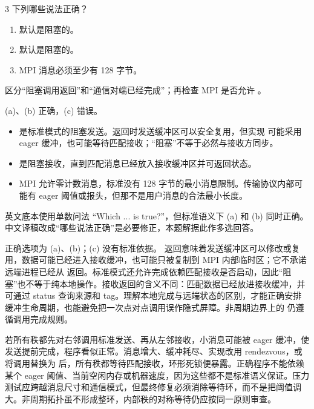 \begin{solutionexercise}{3}
\problemheading 下列哪些说法正确？
\begin{enumerate}[label=(\alph*)]
  \item {} 默认是阻塞的。
  \item {} 默认是阻塞的。
  \item MPI 消息必须至少有 128 字节。
\end{enumerate}

\approachheading 区分“阻塞调用返回”和“通信对端已经完成”；再检查 MPI 是否允许
。

\answerheading (a)、(b) 正确，(c) 错误。
\begin{itemize}
  \item {} 是标准模式的阻塞发送。返回时发送缓冲区可以安全复用，但实现
  可能采用 eager 缓冲，也可能等待匹配接收；“阻塞”不等于必然与接收方同步。
  \item {} 是阻塞接收，直到匹配消息已经放入接收缓冲区并可返回状态。
  \item MPI 允许零计数消息，标准没有 128 字节的最小消息限制。传输协议内部可能有 eager
  阈值或报头，但那不是用户消息的合法最小长度。
\end{itemize}

\editorialnote 英文底本使用单数问法 “Which ... is true?”，但标准语义下 (a) 和
(b) 同时正确。中文译稿改成“哪些说法正确”是必要修正，本题解据此作多选回答。

\conclusionheading 正确选项为 (a)、(b)；(c) 没有标准依据。
\discussionheading
{}
 返回意味着发送缓冲区可以修改或复用，数据可能已经进入接收缓冲，也可能只被复制到 MPI 内部临时区；它不承诺远端进程已经从  返回。标准模式还允许完成依赖匹配接收是否启动，因此“阻塞”也不等于纯本地操作。接收返回的含义不同：匹配数据已经放进接收缓冲，并可通过 status 查询来源和 tag。理解本地完成与远端状态的区别，才能正确安排缓冲生命周期，也能避免把一次点对点调用误作隐式屏障。非周期边界上的  仍遵循调用完成规则。

若所有秩都先对右邻调用标准发送、再从左邻接收，小消息可能被 eager 缓冲，使发送提前完成，程序看似正常。消息增大、缓冲耗尽、实现改用 rendezvous，或将调用替换为  后，所有秩都等待匹配接收，环形死锁便暴露。正确程序不能依赖某个 eager 阈值、当前空闲内存或机器速度，因为这些都不是标准语义保证。压力测试应跨越消息尺寸和通信模式，但最终修复必须消除等待环，而不是把阈值调大。非周期拓扑虽不形成整环，内部秩的对称等待仍应按同一原则审查。


\end{solutionexercise}
